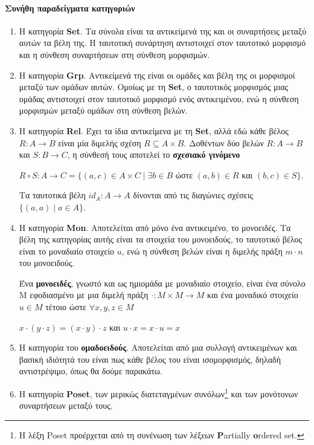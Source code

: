 \documentclass [a4paper,11pt] {book}
\theoremstyle{definition}
\theoremstyle{definition}
\begin{document}
\paragraph{Συνήθη παραδείγματα κατηγοριών}
\label{ExamplesOfCategories}
\begin{enumerate}
\item Η κατηγορία \textbf{Set}. Τα σύνολα είναι τα αντικείμενά της και οι συναρτήσεις μεταξύ αυτών τα βέλη της. Η ταυτοτική συνάρτηση αντιστοιχεί στον ταυτοτικό μορφισμό και η σύνθεση συναρτήσεων στη σύνθεση μορφισμών.
\item Η κατηγορία \textbf{Grp}. Αντικείμενά της είναι οι ομάδες και βέλη της οι μορφισμοί μεταξύ των ομάδων αυτών. Ομοίως με τη \textbf{Set}, ο ταυτοτικός μορφισμός μιας ομάδας αντιστοιχεί στον ταυτοτικό μορφισμό ενός αντικειμένου, ενώ η σύνθεση μορφισμών μεταξύ ομάδων στη σύνθεση βελών.
\item Η κατηγορία \textbf{Rel}. Έχει τα ίδια αντικείμενα με τη \textbf{Set}, αλλά εδώ κάθε βέλος $R: A\to B$ είναι μία διμελής σχέση $R\subseteq A \times B$. Δοθέντων δύο βελών $R: A\to B$ και $S: B\to C$, η σύνθεσή τους αποτελεί το \textbf{σχεσιακό γινόμενο}
\begin{center}
$R\circ S :A\to C = \{(a,c)\in A \times C \mid \exists b \in B$ ώστε $(a,b)\in R$ και $(b,c)\in S\}$.
\end{center}
Τα ταυτοτικά βέλη $id_{A}:A\to A$ δίνονται από τις διαγώνιες σχέσεις $\{(a,a)\mid a\in A\}$.
\item Η κατηγορία \textbf{Mon}. Αποτελείται από μόνο ένα αντικειμένο, το μονοειδές. Τα βέλη της κατηγορίας αυτής είναι τα στοιχεία του μονοειδούς, το ταυτοτικό βέλος είναι το μοναδιαίο στοιχείο $u$, ενώ η σύνθεση βελών είναι η διμελής πράξη $m \cdot n$ του μονοειδούς.

Ένα \textbf{μονοειδές}, γνωστό και ως ημιομάδα με μοναδιαίο στοιχείο, είναι ένα σύνολο M εφοδιασμένο με μια διμελή πράξη $\cdot : M \times M \to M$ και ένα μοναδικό στοιχείο $u \in M$ τέτοιο ώστε $\forall x,y,z \in M$
\begin{center}
$x\cdot (y \cdot z)=(x\cdot y)\cdot z$
και $u \cdot x = x \cdot u = x$
\end{center}
\item Η κατηγορία του \textbf{ομαδοειδούς}. Αποτελείται από μια συλλογή αντικειμένων και βασική ιδιότητά του είναι πως κάθε βέλος του είναι ισομορφισμός, δηλαδή αντιστρέψιμο, όπως θα δούμε παρακάτω.
\item Η κατηγορία \textbf{Poset}, των μερικώς διατεταγμένων συνόλων\footnote{Η λέξη Poset προέρχεται από τη συνένωση των λέξεων \textbf{P}artially \textbf{o}rdered set.} και των μονότονων συναρτήσεων μεταξύ τους.


\end{enumerate}
\end{document}
